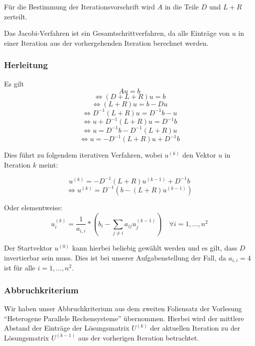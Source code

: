 \documentclass{article}
\begin{document}
Für die Bestimmung der Iterationsvorschrift wird $A$ in die Teile $D$ und $L+R$ zerteilt.

Das Jacobi-Verfahren ist ein Gesamtschrittverfahren, da alle Einträge von $u$ in einer Iteration aus der vorhergehenden Iteration berechnet werden.


\subsubsection{Herleitung}
Es gilt
$$Au = b$$
$$\Leftrightarrow (D+L+R)u = b$$
$$\Leftrightarrow (L+R)u = b - Du$$
$$\Leftrightarrow D^{-1}(L+R)u = D^{-1}b - u$$
$$\Leftrightarrow u + D^{-1}(L+R)u = D^{-1}b$$
$$\Leftrightarrow u = D^{-1}b - D^{-1}(L+R)u$$
$$\Leftrightarrow u = - D^{-1}(L+R)u + D^{-1}b$$

Dies führt zu folgendem iterativen Verfahren, wobei $u^{(k)}$ den Vektor $u$ in Iteration $k$ meint:

$$u^{(k)} = -D^{-1}(L+R)  u^{(k-1)} + D^{-1}b$$
$$\Leftrightarrow u^{(k)} = D^{-1}  \left(b -(L+R)  u^{(k-1)}\right)$$

Oder elementweise:
$$u_i^{(k)} = \frac{1}{a_{i,i}} * (b_i - \sum_{j \neq i}{a_{ij} u_j^{(k-1)}}) \quad \forall i = 1, \ldots, n^2$$

Der Startvektor $u^{(0)}$ kann hierbei beliebig gewählt werden und es gilt, dass $D$ invertierbar sein muss. Dies ist bei unserer Aufgabenstellung der Fall, da $a_{i,i} = 4$ ist für alle $i = 1, \ldots, n^2$.

\subsubsection{Abbruchkriterium} \label{jacobi:abbruch}
Wir haben unser Abbruchkriterium aus dem zweiten Foliensatz der Vorlesung ``Heterogene Parallele Rechensysteme'' übernommen. Hierbei wird der mittlere Abstand der Einträge der Lösungsmatrix $U^{(k)}$ der aktuellen Iteration zu der Lösungsmatrix $U^{(k-1)}$ aus der vorherigen Iteration betrachtet.

\end{document}
